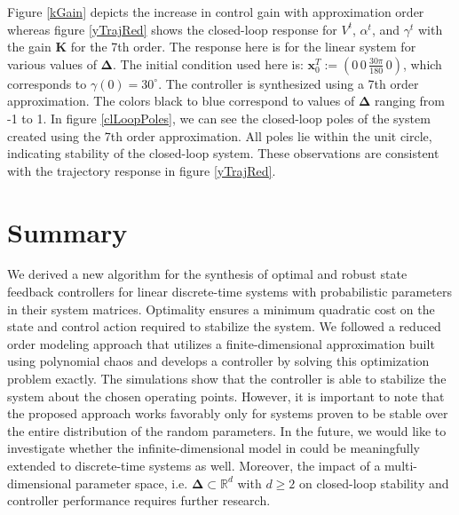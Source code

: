 \documentclass[letterpaper, 10 pt, conference]{ieeeconf}  %
\newcommand{\real}{\mathbb{R}}
\newcommand{\vo}[1]{\boldsymbol{#1}}
\newcommand{\Del}{\vo{\Delta}}
\begin{document}
Figure \ref{kGain} depicts the increase in control gain with approximation order whereas figure \ref{yTrajRed} shows the closed-loop response for $V^t$, $\alpha^t$, and $\gamma^t$ with the gain $\vo{K}$ for the 7th order.
The response here is for the linear system for various values of $\Del$.
The initial condition used here is: $\vo{x}_0^T := (0\, 0\, \frac{30 \pi}{180}\, 0)$, which corresponds
to $\gamma(0) = 30^{\circ}$.
The controller is synthesized using a 7th order approximation. The colors black to blue correspond to values of $\Del$ ranging from -1 to 1.
In figure \ref{clLoopPoles}, we can see the closed-loop poles of the system created using the 7th order approximation. All poles lie within the unit circle, indicating stability of the closed-loop system. These observations are consistent with the trajectory response in figure \ref{yTrajRed}.

\section{Summary}
We derived a new algorithm for the synthesis of optimal and robust state feedback controllers for linear discrete-time systems with probabilistic parameters in their system matrices. Optimality ensures a minimum quadratic cost on the state and control action required to stabilize the system.
We followed a reduced order modeling approach that utilizes a finite-dimensional approximation built using polynomial chaos and develops a controller by solving this optimization problem exactly.
The simulations show that the controller is able to stabilize the system about the chosen operating points. %
However, it is important to note that the proposed approach works favorably only for systems proven to be stable over the entire distribution of the random parameters.
In the future, we would like to investigate whether the infinite-dimensional model in \cite{bhattacharya2019robust} could be meaningfully extended to discrete-time systems as well.
Moreover, the impact of a multi-dimensional parameter space, i.e. $\Del \subset \real^d$ with $d \geq 2$ on closed-loop stability and controller performance requires further research.
\end{document}

